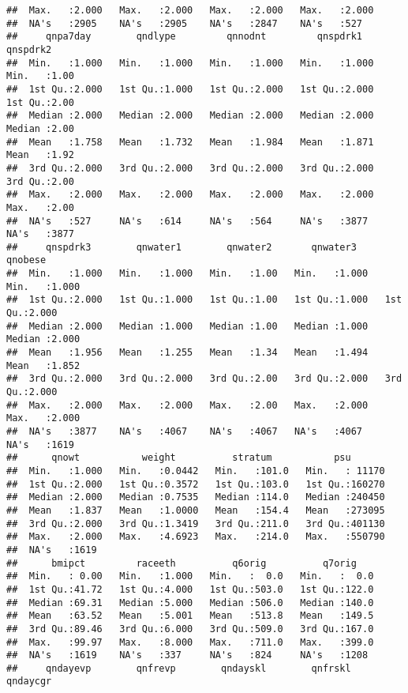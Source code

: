 \documentclass[
]{article}
\begin{document}
\begin{verbatim}
##  Max.   :2.000   Max.   :2.000   Max.   :2.000   Max.   :2.000  
##  NA's   :2905    NA's   :2905    NA's   :2847    NA's   :527    
##     qnpa7day        qndlype         qnnodnt         qnspdrk1        qnspdrk2   
##  Min.   :1.000   Min.   :1.000   Min.   :1.000   Min.   :1.000   Min.   :1.00  
##  1st Qu.:2.000   1st Qu.:1.000   1st Qu.:2.000   1st Qu.:2.000   1st Qu.:2.00  
##  Median :2.000   Median :2.000   Median :2.000   Median :2.000   Median :2.00  
##  Mean   :1.758   Mean   :1.732   Mean   :1.984   Mean   :1.871   Mean   :1.92  
##  3rd Qu.:2.000   3rd Qu.:2.000   3rd Qu.:2.000   3rd Qu.:2.000   3rd Qu.:2.00  
##  Max.   :2.000   Max.   :2.000   Max.   :2.000   Max.   :2.000   Max.   :2.00  
##  NA's   :527     NA's   :614     NA's   :564     NA's   :3877    NA's   :3877  
##     qnspdrk3        qnwater1        qnwater2       qnwater3        qnobese     
##  Min.   :1.000   Min.   :1.000   Min.   :1.00   Min.   :1.000   Min.   :1.000  
##  1st Qu.:2.000   1st Qu.:1.000   1st Qu.:1.00   1st Qu.:1.000   1st Qu.:2.000  
##  Median :2.000   Median :1.000   Median :1.00   Median :1.000   Median :2.000  
##  Mean   :1.956   Mean   :1.255   Mean   :1.34   Mean   :1.494   Mean   :1.852  
##  3rd Qu.:2.000   3rd Qu.:2.000   3rd Qu.:2.00   3rd Qu.:2.000   3rd Qu.:2.000  
##  Max.   :2.000   Max.   :2.000   Max.   :2.00   Max.   :2.000   Max.   :2.000  
##  NA's   :3877    NA's   :4067    NA's   :4067   NA's   :4067    NA's   :1619   
##      qnowt           weight          stratum           psu        
##  Min.   :1.000   Min.   :0.0442   Min.   :101.0   Min.   : 11170  
##  1st Qu.:2.000   1st Qu.:0.3572   1st Qu.:103.0   1st Qu.:160270  
##  Median :2.000   Median :0.7535   Median :114.0   Median :240450  
##  Mean   :1.837   Mean   :1.0000   Mean   :154.4   Mean   :273095  
##  3rd Qu.:2.000   3rd Qu.:1.3419   3rd Qu.:211.0   3rd Qu.:401130  
##  Max.   :2.000   Max.   :4.6923   Max.   :214.0   Max.   :550790  
##  NA's   :1619                                                     
##      bmipct         raceeth          q6orig          q7orig     
##  Min.   : 0.00   Min.   :1.000   Min.   :  0.0   Min.   :  0.0  
##  1st Qu.:41.72   1st Qu.:4.000   1st Qu.:503.0   1st Qu.:122.0  
##  Median :69.31   Median :5.000   Median :506.0   Median :140.0  
##  Mean   :63.52   Mean   :5.001   Mean   :513.8   Mean   :149.5  
##  3rd Qu.:89.46   3rd Qu.:6.000   3rd Qu.:509.0   3rd Qu.:167.0  
##  Max.   :99.97   Max.   :8.000   Max.   :711.0   Max.   :399.0  
##  NA's   :1619    NA's   :337     NA's   :824     NA's   :1208   
##     qndayevp        qnfrevp        qndayskl        qnfrskl         qndaycgr   

\end{verbatim}
\end{document}
